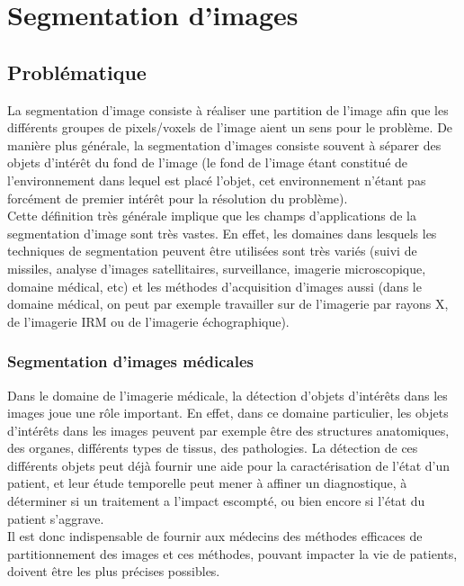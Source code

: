 \section{Segmentation d'images}

\subsection{Problématique}
La segmentation d'image consiste à réaliser une partition de l'image afin que les différents groupes de pixels/voxels de l'image aient un sens pour le problème. De manière plus générale, la segmentation d'images consiste souvent à séparer des objets d'intérêt du fond de l'image (le fond de l'image étant constitué de l'environnement dans lequel est placé l'objet, cet environnement n'étant pas forcément de premier intérêt pour la résolution du problème).\\

Cette définition très générale implique que les champs d'applications de la segmentation d'image sont très vastes. En effet, les domaines dans lesquels les techniques de segmentation peuvent être utilisées sont très variés (suivi de missiles, analyse d'images satellitaires, surveillance, imagerie microscopique, domaine médical, etc) et les méthodes d'acquisition d'images aussi (dans le domaine médical, on peut par exemple travailler sur de l'imagerie par rayons X, de l'imagerie IRM ou de l'imagerie échographique).

\subsubsection*{Segmentation d'images médicales}

Dans le domaine de l'imagerie médicale, la détection d'objets d'intérêts dans les images joue une rôle important. En effet, dans ce domaine particulier, les objets d'intérêts dans les images peuvent par exemple être des structures anatomiques, des organes, différents types de tissus, des pathologies. La détection de ces différents objets peut déjà fournir une aide pour la caractérisation de l'état d'un patient, et leur étude temporelle peut mener à affiner un diagnostique, à déterminer si un traitement a l'impact escompté, ou bien encore si l'état du patient s'aggrave.\\

Il est donc indispensable de fournir aux médecins des méthodes efficaces de partitionnement des images et ces méthodes, pouvant impacter la vie de patients, doivent être les plus précises possibles.\\


